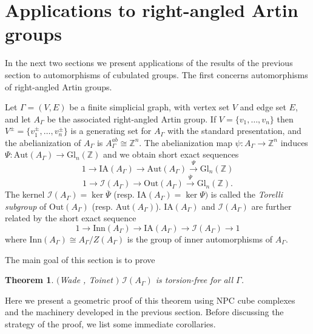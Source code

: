 \documentclass[11pt]{amsart}
\newtheorem{thm}{Theorem}
\numberwithin{thm}{section}
\theoremstyle{remark}
\theoremstyle{definition}
\newcommand{\overl}[1]{\overline{#1}}
\newcommand{\Z}{\mathbb{Z}}
\newcommand{\Aut}{\text{Aut}}
\newcommand{\Out}{\text{Out}}
\newcommand{\IA}{\text{IA}}
\newcommand{\Inn}{\text{Inn}}
\newcommand{\Gl}{\text{Gl}}
\begin{document}
\section{Applications to right-angled Artin groups}
In the next two sections we present applications of the results of the previous section to automorphisms of cubulated groups. The first concerns automorphisms of right-angled Artin groups.  

Let $\Gamma=(V,E)$ be a finite simplicial graph, with vertex set $V$ and edge set $E$, and let $A_\Gamma$ be the associated right-angled Artin group.  
%
%
If $V=\{v_1,\ldots, v_n\}$ then $V^{\pm}=\{v_1^{\pm},\ldots, v_n^{\pm}\}$ is a generating set for $A_\Gamma$ with the standard presentation, and the abelianization of $A_\Gamma$ is $A_\Gamma^{ab}\cong \Z^n$.  The abelianization map $\psi:A_\Gamma\rightarrow\Z^n$ induces $\Psi:\Aut(A_\Gamma)\rightarrow \Gl_n(\Z)$ and we obtain short exact sequences
\[1\rightarrow \IA(A_\Gamma)\rightarrow \Aut(A_\Gamma)\xrightarrow{\Psi} \Gl_n(\Z)\]\[1\rightarrow \mathcal{I}(A_\Gamma)\rightarrow \Out(A_\Gamma)\xrightarrow{\overl{\Psi}} \Gl_n(\Z).\]
The kernel $\mathcal{I}(A_\Gamma)=\ker\overl{\Psi}$ (resp. $\IA(A_\Gamma)=\ker\Psi)$ is called the \emph{Torelli subgroup} of $\Out(A_\Gamma)$ (resp. $\Aut(A_\Gamma)$).  $\IA(A_\Gamma)$ and $\mathcal{I}(A_\Gamma)$ are further related by the short exact sequence \[1\rightarrow \Inn(A_\Gamma)\rightarrow \IA(A_\Gamma) \rightarrow\mathcal{I}(A_\Gamma)\rightarrow 1\] where $\Inn(A_\Gamma)\cong A_\Gamma/Z(A_\Gamma)$ is the group of inner automorphisms of $A_\Gamma$. 

The main goal of this section is to prove
\begin{thm} \label{torsionfree}$($Wade \cite{Wa13}, Toinet \cite{To13} $)$ $\mathcal{I}(A_\Gamma)$ is torsion-free for all $\Gamma$.  
\end{thm}
Here we present a geometric proof of this theorem using NPC cube complexes and the machinery developed in the previous section.  Before discussing the strategy of the proof, we list some immediate corollaries.
\end{document}
